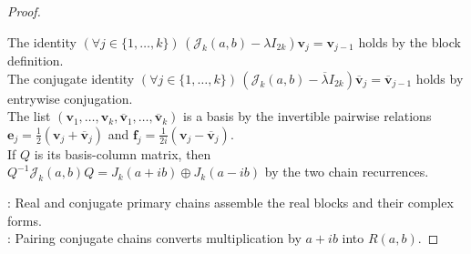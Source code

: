 \begin{theorem}
\begin{proof}
\begin{enumerate}[label=(\roman*)]
The identity $(\forall j\in\{1,\ldots,k\})\,(\mathcal{J}_k(a,b)-\lambda I_{2k})\mathbf{v}_j=\mathbf{v}_{j-1}$ holds by the block definition.\\
The conjugate identity $(\forall j\in\{1,\ldots,k\})\,(\mathcal{J}_k(a,b)-\overline{\lambda}I_{2k})\overline{\mathbf{v}}_j=\overline{\mathbf{v}}_{j-1}$ holds by entrywise conjugation.\\
The list $(\mathbf{v}_1,\ldots,\mathbf{v}_k,\overline{\mathbf{v}}_1,\ldots,\overline{\mathbf{v}}_k)$ is a basis by the invertible pairwise relations $\mathbf{e}_j=\frac{1}{2}(\mathbf{v}_j+\overline{\mathbf{v}}_j)$ and $\mathbf{f}_j=\frac{1}{2i}(\mathbf{v}_j-\overline{\mathbf{v}}_j)$.\\
If $Q$ is its basis-column matrix, then $Q^{-1}\mathcal{J}_k(a,b)Q=J_k(a+ib)\oplus J_k(a-ib)$ by the two chain recurrences.
\end{enumerate}
: Real and conjugate primary chains assemble the real blocks and their complex forms.\\
: Pairing conjugate chains converts multiplication by $a+ib$ into $R(a,b)$.
\end{proof}
\end{theorem}

